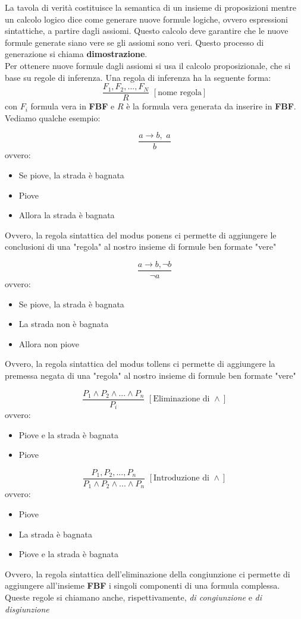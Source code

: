 \documentclass[a4paper,12pt, oneside]{book}
\begin{document}
La tavola di verità costituisce la semantica di un insieme di proposizioni mentre un calcolo logico dice come generare nuove formule logiche, ovvero espressioni sintattiche, a partire dagli assiomi. Questo calcolo deve garantire che le nuove formule generate siano vere se gli assiomi sono veri. Questo processo di generazione si chiama \textbf{dimostrazione}.\\
Per ottenere nuove formule dagli assiomi si usa il calcolo proposizionale, che si base su regole di inferenza. Una regola di inferenza ha la seguente forma:
$$\frac{F_1,F_2,...,F_N}{R}\,\,[\mbox{nome regola}]$$
con $F_i$ formula vera in \textbf{FBF} e $R$ è la formula vera generata da inserire in \textbf{FBF}. Vediamo qualche esempio:
\begin{esempio}
$$\frac{a\to b,\,\,a}{b}$$
ovvero:
\begin{itemize}
\item Se piove, la strada è bagnata
\item Piove
\item Allora la strada è bagnata
\end{itemize}
Ovvero, la regola sintattica del modus ponens ci permette di
aggiungere le conclusioni di una "regola" al nostro insieme di formule ben formate "vere"
\end{esempio}
\begin{esempio}
$$\frac{a\to b, \neg b}{\neg a}$$
ovvero:
\begin{itemize}
\item Se piove, la strada è bagnata
\item La strada non è bagnata
\item Allora non piove
\end{itemize}
Ovvero, la regola sintattica del modus tollens ci permette di
aggiungere la premessa negata di una "regola" al nostro insieme di formule ben formate "vere"
\end{esempio}
\begin{esempio}
$$\frac{P_1\wedge P_2 \wedge ... \wedge P_n}{P_i}\,\,[\mbox{Eliminazione di }\wedge]$$
ovvero:
\begin{itemize}
\item Piove e la strada è bagnata
\item Piove
\end{itemize}
$$\frac{P_1, P_2,...,P_n}{P_1\wedge P_2 \wedge ... \wedge P_n}\,\,[\mbox{Introduzione di }\wedge]$$
ovvero:
\begin{itemize}
\item Piove
\item La strada è bagnata
\item Piove e la strada è bagnata
\end{itemize}
Ovvero, la regola sintattica dell'eliminazione della congiunzione ci permette di aggiungere all'insieme \textbf{FBF} i singoli componenti di una formula complessa. \\
Queste regole si chiamano anche, rispettivamente, \textit{di congiunzione} e \textit{di disgiunzione}
\end{esempio}
\end{document}
